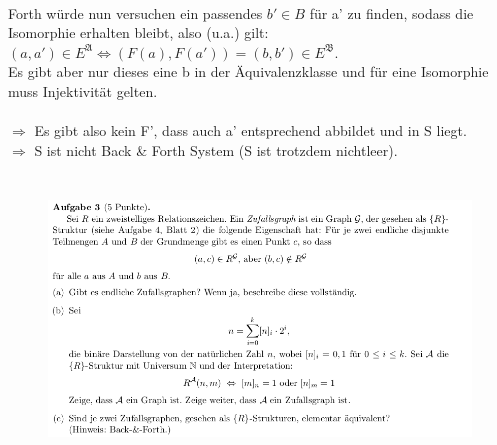 \documentclass[a4paper]{scrartcl}
\begin{document}
\begin{itemize}
            \\Forth würde nun versuchen ein passendes $b' \in B$ für a' zu finden, sodass die Isomorphie erhalten bleibt, also (u.a.) gilt:\\
            $(a, a') \in E^{\mathfrak{A}} \Leftrightarrow (F(a),F(a')) = (b, b') \in E^{\mathfrak{B}}$.\\
            Es gibt aber nur dieses eine b in der Äquivalenzklasse und für eine Isomorphie muss Injektivität gelten.\\
            \\$\Rightarrow$ Es gibt also kein F', dass auch a' entsprechend abbildet und in S liegt.\\
            $\Rightarrow$ S ist nicht Back \& Forth System (S ist trotzdem nichtleer).



    \end{itemize}


\section*{}%
\label{sec:aufgabe_3}

    \begin{figure}[H]
        \centering
        \includegraphics[scale=0.6]{./A-3.png}
        \label{fig:}
    \end{figure}
\end{document}
